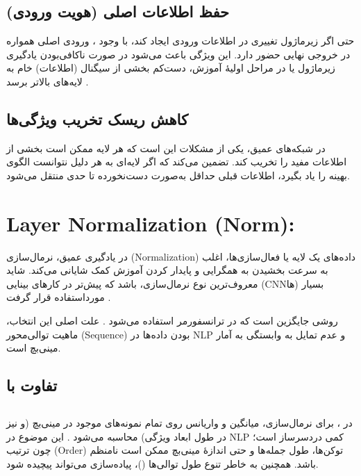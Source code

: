 \subsection*{حفظ اطلاعات اصلی (هویت ورودی)}
حتی اگر زیرماژول تغییری در اطلاعات ورودی ایجاد کند، با وجود ، ورودی اصلی همواره در خروجی نهایی حضور دارد.
این ویژگی باعث می‌شود در صورت ناکافی‌بودن یادگیری زیرماژول یا در مراحل اولیهٔ آموزش، دست‌کم بخشی از سیگنال (اطلاعات) خام به لایه‌های بالاتر برسد \cite{he2016deep,vaswani2017attention}.

\subsection*{کاهش ریسک تخریب ویژگی‌ها}
در شبکه‌های عمیق، یکی از مشکلات این است که هر لایه ممکن است بخشی از اطلاعات مفید را تخریب کند.  تضمین می‌کند که اگر لایه‌ای به هر دلیل نتوانست الگوی بهینه را یاد بگیرد، اطلاعات قبلی حداقل به‌صورت دست‌نخورده تا حدی منتقل می‌شود.


\section{Layer Normalization (Norm):}

در یادگیری عمیق، نرمال‌سازی (Normalization) داده‌های یک لایه یا فعال‌سازی‌ها، اغلب به سرعت بخشیدن به همگرایی و پایدار کردن آموزش کمک شایانی می‌کند. شاید معروف‌ترین نوع نرمال‌سازی،  باشد که پیش‌تر در کارهای بینایی (CNNها) بسیار مورداستفاده قرار گرفت \cite{ioffe2015batch}.

 روشی جایگزین است که در ترانسفورمر استفاده می‌شود \cite{ba2016layer,vaswani2017attention}. علت اصلی این انتخاب، ماهیت توالی‌محور (Sequence) بودن داده‌ها در NLP و عدم تمایل به وابستگی به آمار مینی‌بچ است.

\subsection*{تفاوت  با }

\subsection*{}
در ، برای نرمال‌سازی، میانگین و واریانس روی تمام نمونه‌های موجود در مینی‌بچ (و نیز در طول ابعاد ویژگی) محاسبه می‌شود \cite{ioffe2015batch}.
این موضوع در NLP کمی دردسرساز است؛ چون ترتیب (Order) توکن‌ها، طول جمله‌ها و حتی اندازهٔ مینی‌بچ ممکن است نامنظم باشد.
همچنین به خاطر تنوع طول توالی‌ها ()، پیاده‌سازی  می‌تواند پیچیده شود.

